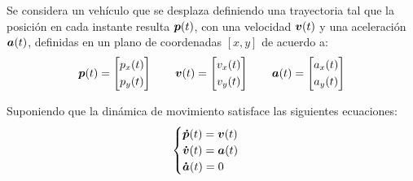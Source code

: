 
	Se considera un vehículo que se desplaza definiendo una trayectoria tal que la posición en cada instante resulta $\boldsymbol{p}(t)$, con una velocidad $\boldsymbol{v}(t)$ y una aceleración $\boldsymbol{a}(t)$, definidas en un plano de coordenadas $[x,y]$ de acuerdo a:
	\begin{equation*}
		\vect{p}(t) = \begin{bmatrix} p_x(t) \\[0.3em] p_y(t) \end{bmatrix} \qquad%
		\vect{v}(t) = \begin{bmatrix} v_x(t) \\[0.3em] v_y(t) \end{bmatrix} \qquad%
		\vect{a}(t) = \begin{bmatrix} a_x(t) \\[0.3em] a_y(t) \end{bmatrix}%
	\end{equation*}

	Suponiendo que la dinámica de movimiento satisface las siguientes ecuaciones:
	\begin{equation}
		\begin{cases}
			\boldsymbol{\dot{p}}(t) = \boldsymbol{v}(t)\\
			\boldsymbol{\dot{v}}(t) = \boldsymbol{a}(t)\\
			\boldsymbol{\dot{a}}(t) = 0
		\end{cases}
		\label{eq:dinamica_enun}
	\end{equation}

